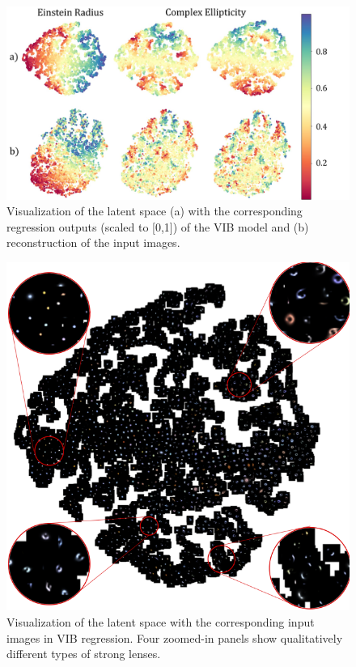 \documentclass[12pt, twocolumn, apj]{openjournal}
\begin{document}
\begin{figure}[!tp]
\centering
\includegraphics[width=\linewidth]{"Figures/VIB_VAE_regression.pdf"}
\caption{Visualization of the latent space (a) with the corresponding regression outputs (scaled to [0,1]) of the VIB model and (b) reconstruction of the input images.}
\label{Fig:Regression_latent_output} 
\end{figure}


\begin{figure}[t!]
\centering
\includegraphics[width=0.9\linewidth]{Figures/Latent_space_VIB_reg.png}
\caption{Visualization of the latent space with the corresponding input images in VIB regression. Four zoomed-in panels show qualitatively different types of strong lenses.}
\label{Fig:Regression_tsne_images} 
\end{figure}
\end{document}

